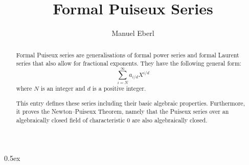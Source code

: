 \documentclass[11pt,a4paper]{article}
\begin{document}
\title{Formal Puiseux Series}
\author{Manuel Eberl}
\maketitle

\begin{abstract}
Formal Puiseux series are generalisations of formal power series and formal Laurent series that also allow for fractional exponents. They have the following general form:
\[\sum_{i=N}^\infty a_{i/d} X^{i/d}\]
where $N$ is an integer and $d$ is a positive integer.

This entry defines these series including their basic algebraic properties. Furthermore, it proves the Newton--Puiseux Theorem, namely that the Puiseux series over an algebraically closed field of characteristic 0 are also algebraically closed.
\end{abstract}

\newpage
\tableofcontents
\newpage
\parindent 0pt\parskip 0.5ex



\nocite{corless96}


\end{document}
